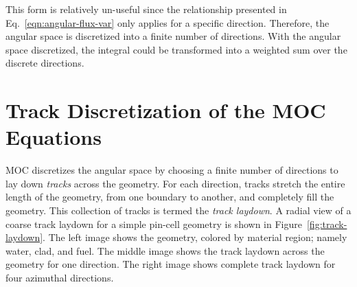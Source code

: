 This form is relatively un-useful since the relationship presented in Eq.~\ref{eqn:angular-flux-var} only applies for a specific direction. Therefore, the angular space is discretized into a finite number of directions. With the angular space discretized, the integral could be transformed into a weighted sum over the discrete directions.

\section{Track Discretization of the MOC Equations}

MOC discretizes the angular space by choosing a finite number of directions to lay down \textit{tracks} across the geometry. For each direction, tracks stretch the entire length of the geometry, from one boundary to another, and completely fill the geometry. This collection of tracks is termed the \textit{track laydown}. A radial view of a coarse track laydown for a simple pin-cell geometry is shown in Figure~\ref{fig:track-laydown}. The left image shows the geometry, colored by material region; namely water, clad, and fuel. The middle image shows the track laydown across the geometry for one direction. The right image shows complete track laydown for four azimuthal directions.

